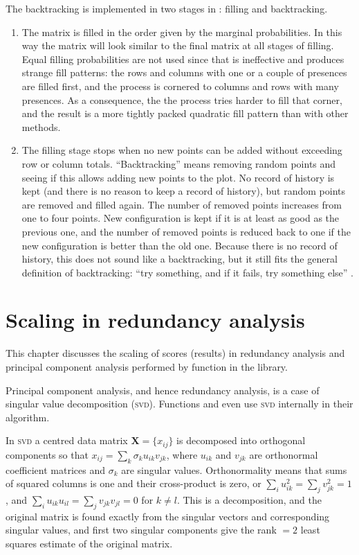 \documentclass[a4paper,10pt,twocolumn]{article}
\begin{document}
The backtracking is implemented in two stages in : filling and
backtracking.
\begin{enumerate}
  \item The matrix is filled in the order given by the marginal
    probabilities. In this way the matrix will look similar to the
    final matrix at all stages of filling. Equal filling probabilities
    are not used since that is ineffective and produces strange fill
    patterns: the rows and columns with one or a couple of presences
    are filled first, and the process is cornered to columns and
    rows with many presences. As a consequence, the the process tries
    harder to fill that corner, and the result is a more tightly
    packed quadratic fill pattern than with other methods.
  \item The filling stage stops when no new points can be added
    without exceeding row or column totals. ``Backtracking'' means
    removing random points and seeing if this allows adding new points
    to the plot. No record of history is kept (and there is no reason
    to keep a record of history), but random points are removed and
    filled again. The number of removed points increases from one to
    four points. New configuration is kept if it is at least as good
    as the previous one, and the number of removed points is reduced
    back to one if the new configuration is better than the old one.
    Because there is no record of history, this does not sound like a
    backtracking, but it still fits the general definition of
    backtracking: ``try something, and if it fails, try something
    else'' \citep{Sedgewick90}.
\end{enumerate}


\section{Scaling in redundancy analysis}

This chapter discusses the scaling of scores (results) in redundancy
analysis and principal component analysis performed by function
 in the  library.  

Principal component analysis, and hence redundancy analysis, is a case
of singular value decomposition (\textsc{svd}).  Functions
 and  even use \textsc{svd} internally in
their algorithm.

In \textsc{svd} a centred data matrix $\mathbf{X} = \{x_{ij}\}$ is decomposed into orthogonal
components so that $x_{ij} = \sum_k \sigma_k u_{ik} v_{jk}$, where
$u_{ik}$ and $v_{jk}$ are orthonormal coefficient matrices and
$\sigma_k$ are singular values.  Orthonormality means that sums of
squared columns is one and their cross-product is zero, or $\sum_i
u_{ik}^2 = \sum_j v_{jk}^2 = 1$, and $\sum_i u_{ik} u_{il} = \sum_j
v_{jk} v_{jl} = 0$ for $k \neq l$. This is a decomposition, and the
original matrix is found exactly from the singular vectors and
corresponding singular values, and first two singular components give
the rank $=2$ least squares estimate of the original matrix.
\end{document}

